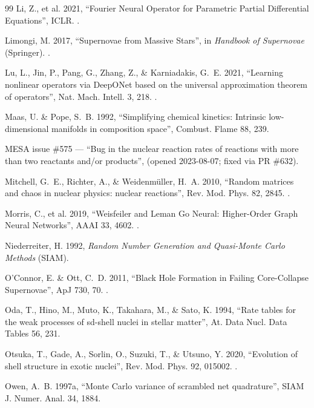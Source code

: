 \begin{thebibliography}{99}
Li, Z., et al. 2021, ``Fourier Neural Operator for Parametric Partial
Differential Equations'', ICLR. .

Limongi, M. 2017, ``Supernovae from Massive Stars'', in \emph{Handbook of
Supernovae} (Springer). .

Lu, L., Jin, P., Pang, G., Zhang, Z., \& Karniadakis, G.~E. 2021, ``Learning
nonlinear operators via DeepONet based on the universal approximation theorem
of operators'', Nat. Mach. Intell. 3, 218. .

Maas, U. \& Pope, S.~B. 1992, ``Simplifying chemical kinetics: Intrinsic
low-dimensional manifolds in composition space'', Combust. Flame 88, 239.

MESA issue \#575 --- ``Bug in the nuclear reaction rates of reactions with
more than two reactants and/or products'',
 (opened 2023-08-07; fixed via PR
\#632).

Mitchell, G.~E., Richter, A., \& Weidenmüller, H.~A. 2010, ``Random matrices
and chaos in nuclear physics: nuclear reactions'', Rev. Mod. Phys. 82, 2845.
.

Morris, C., et al. 2019, ``Weisfeiler and Leman Go Neural: Higher-Order Graph
Neural Networks'', AAAI 33, 4602. .

Niederreiter, H. 1992, \emph{Random Number Generation and Quasi-Monte Carlo
Methods} (SIAM).

O'Connor, E. \& Ott, C.~D. 2011, ``Black Hole Formation in Failing
Core-Collapse Supernovae'', ApJ 730, 70. .

Oda, T., Hino, M., Muto, K., Takahara, M., \& Sato, K. 1994, ``Rate tables for
the weak processes of sd-shell nuclei in stellar matter'', At. Data Nucl. Data
Tables 56, 231.

Otsuka, T., Gade, A., Sorlin, O., Suzuki, T., \& Utsuno, Y. 2020, ``Evolution
of shell structure in exotic nuclei'', Rev. Mod. Phys. 92, 015002.
.

Owen, A.~B. 1997a, ``Monte Carlo variance of scrambled net quadrature'', SIAM
J. Numer. Anal. 34, 1884.


\end{thebibliography}
